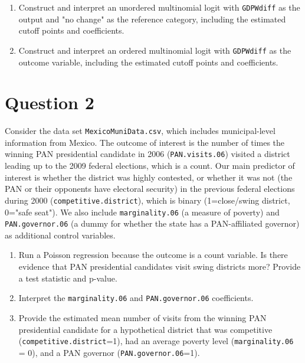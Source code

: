 \documentclass[12pt,letterpaper]{article}
\begin{document}
\begin{enumerate}
	\item Construct and interpret an unordered multinomial logit with \texttt{GDPWdiff} as the output and "no change" as the reference category, including the estimated cutoff points and coefficients.
	\item Construct and interpret an ordered multinomial logit with \texttt{GDPWdiff} as the outcome variable, including the estimated cutoff points and coefficients.
	
	
\end{enumerate}

\section*{Question 2} 
\vspace{.25cm}

\noindent Consider the data set \texttt{MexicoMuniData.csv}, which includes municipal-level information from Mexico. The outcome of interest is the number of times the winning PAN presidential candidate in 2006 (\texttt{PAN.visits.06}) visited a district leading up to the 2009 federal elections, which is a count. Our main predictor of interest is whether the district was highly contested, or whether it was not (the PAN or their opponents have electoral security) in the previous federal elections during 2000 (\texttt{competitive.district}), which is binary (1=close/swing district, 0="safe seat"). We also include \texttt{marginality.06} (a measure of poverty) and \texttt{PAN.governor.06} (a dummy for whether the state has a PAN-affiliated governor) as additional control variables. 

\begin{enumerate}
	\item [(a)]
	Run a Poisson regression because the outcome is a count variable. Is there evidence that PAN presidential candidates visit swing districts more? Provide a test statistic and p-value.

	\item [(b)]
	Interpret the \texttt{marginality.06} and \texttt{PAN.governor.06} coefficients.
	
	\item [(c)]
	Provide the estimated mean number of visits from the winning PAN presidential candidate for a hypothetical district that was competitive (\texttt{competitive.district}=1), had an average poverty level (\texttt{marginality.06} = 0), and a PAN governor (\texttt{PAN.governor.06}=1).
	
\end{enumerate}
\newpage
\end{document}
